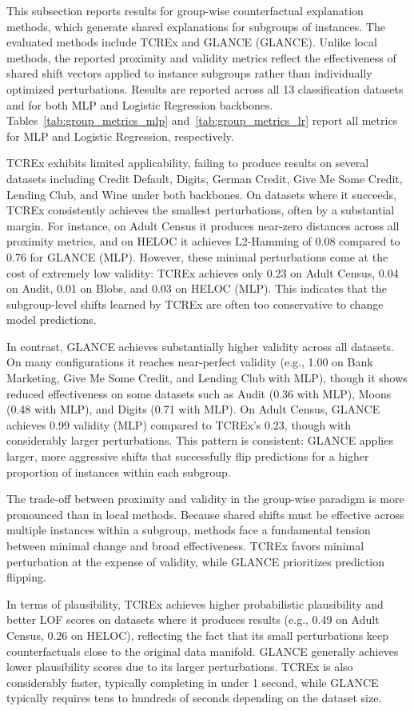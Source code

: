 \documentclass[runningheads]{llncs}
\begin{document}
This subsection reports results for group-wise counterfactual explanation methods, which generate shared explanations for subgroups of instances. The evaluated methods include TCREx and GLANCE (GLANCE). Unlike local methods, the reported proximity and validity metrics reflect the effectiveness of shared shift vectors applied to instance subgroups rather than individually optimized perturbations. Results are reported across all 13 classification datasets and for both MLP and Logistic Regression backbones. Tables~\ref{tab:group_metrics_mlp} and~\ref{tab:group_metrics_lr} report all metrics for MLP and Logistic Regression, respectively.

TCREx exhibits limited applicability, failing to produce results on several datasets including Credit Default, Digits, German Credit, Give Me Some Credit, Lending Club, and Wine under both backbones. On datasets where it succeeds, TCREx consistently achieves the smallest perturbations, often by a substantial margin. For instance, on Adult Census it produces near-zero distances across all proximity metrics, and on HELOC it achieves L2-Hamming of 0.08 compared to 0.76 for GLANCE (MLP). However, these minimal perturbations come at the cost of extremely low validity: TCREx achieves only 0.23 on Adult Census, 0.04 on Audit, 0.01 on Blobs, and 0.03 on HELOC (MLP). This indicates that the subgroup-level shifts learned by TCREx are often too conservative to change model predictions.

In contrast, GLANCE achieves substantially higher validity across all datasets. On many configurations it reaches near-perfect validity (e.g., 1.00 on Bank Marketing, Give Me Some Credit, and Lending Club with MLP), though it shows reduced effectiveness on some datasets such as Audit (0.36 with MLP), Moons (0.48 with MLP), and Digits (0.71 with MLP). On Adult Census, GLANCE achieves 0.99 validity (MLP) compared to TCREx's 0.23, though with considerably larger perturbations. This pattern is consistent: GLANCE applies larger, more aggressive shifts that successfully flip predictions for a higher proportion of instances within each subgroup.

The trade-off between proximity and validity in the group-wise paradigm is more pronounced than in local methods. Because shared shifts must be effective across multiple instances within a subgroup, methods face a fundamental tension between minimal change and broad effectiveness. TCREx favors minimal perturbation at the expense of validity, while GLANCE prioritizes prediction flipping.

In terms of plausibility, TCREx achieves higher probabilistic plausibility and better LOF scores on datasets where it produces results (e.g., 0.49 on Adult Census, 0.26 on HELOC), reflecting the fact that its small perturbations keep counterfactuals close to the original data manifold. GLANCE generally achieves lower plausibility scores due to its larger perturbations. TCREx is also considerably faster, typically completing in under 1 second, while GLANCE typically requires tens to hundreds of seconds depending on the dataset size.






\end{document}
